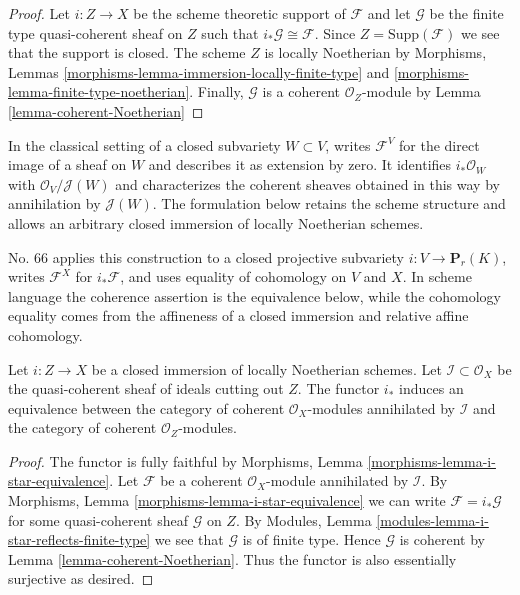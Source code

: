 \begin{proof}
Let $i : Z \to X$ be the scheme theoretic support of $\mathcal{F}$ and
let $\mathcal{G}$ be the finite type quasi-coherent sheaf on $Z$
such that $i_*\mathcal{G} \cong \mathcal{F}$.
Since $Z = \text{Supp}(\mathcal{F})$ we see that the support is closed.
The scheme $Z$ is locally Noetherian by
Morphisms, Lemmas \ref{morphisms-lemma-immersion-locally-finite-type}
and \ref{morphisms-lemma-finite-type-noetherian}.
Finally, $\mathcal{G}$ is a coherent $\mathcal{O}_Z$-module by
Lemma \ref{lemma-coherent-Noetherian}
\end{proof}

\begin{lemma}
\label{lemma-i-star-equivalence}
\begin{reference}
\cite[Chapter II, \S 2, no. 39, Proposition 3, p. 232]{FAC}
\cite[Chapter III, \S 3, no. 66, opening paragraph, p. 259]{FAC}
\end{reference}
\begin{history}
In the classical setting of a closed subvariety $W \subset V$,
\cite{FAC} writes $\mathcal{F}^V$ for the direct image of a sheaf on $W$
and describes it as extension by zero. It identifies
$i_*\mathcal{O}_W$ with $\mathcal{O}_V/\mathcal{J}(W)$ and characterizes
the coherent sheaves obtained in this way by annihilation by
$\mathcal{J}(W)$. The formulation below retains the scheme structure and
allows an arbitrary closed immersion of locally Noetherian schemes.

No. 66 applies this construction to a closed projective subvariety
$i:V\to\mathbf{P}_r(K)$, writes $\mathcal{F}^X$ for $i_*\mathcal{F}$,
and uses equality of cohomology on $V$ and $X$. In scheme language the
coherence assertion is the equivalence below, while the cohomology equality
comes from the affineness of a closed immersion and relative affine
cohomology.
\end{history}
Let $i : Z \to X$ be a closed immersion of locally Noetherian schemes.
Let $\mathcal{I} \subset \mathcal{O}_X$ be the quasi-coherent sheaf of ideals
cutting out $Z$. The functor $i_*$ induces an equivalence between the
category of coherent $\mathcal{O}_X$-modules annihilated by $\mathcal{I}$
and the category of coherent $\mathcal{O}_Z$-modules.
\end{lemma}

\begin{proof}
The functor is fully faithful by
Morphisms, Lemma \ref{morphisms-lemma-i-star-equivalence}.
Let $\mathcal{F}$ be a coherent $\mathcal{O}_X$-module
annihilated by $\mathcal{I}$. By
Morphisms, Lemma \ref{morphisms-lemma-i-star-equivalence}
we can write $\mathcal{F} = i_*\mathcal{G}$ for some quasi-coherent
sheaf $\mathcal{G}$ on $Z$. By
Modules, Lemma \ref{modules-lemma-i-star-reflects-finite-type}
we see that $\mathcal{G}$ is of finite type.
Hence $\mathcal{G}$ is coherent by
Lemma \ref{lemma-coherent-Noetherian}.
Thus the functor is also essentially surjective as desired.
\end{proof}

